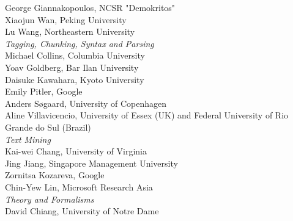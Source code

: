                                     \hspace*{0.2in} George Giannakopoulos, NCSR "Demokritos" \\
                                    \hspace*{0.2in} Xiaojun Wan, Peking University \\
                                    \hspace*{0.2in} Lu Wang, Northeastern University \\
                            \emph{Tagging, Chunking, Syntax and Parsing} \\
                                    \hspace*{0.2in} Michael Collins, Columbia University \\
                                    \hspace*{0.2in} Yoav Goldberg, Bar Ilan University \\
                                    \hspace*{0.2in} Daisuke Kawahara, Kyoto University \\
                                    \hspace*{0.2in} Emily Pitler, Google \\
                                    \hspace*{0.2in} Anders S{\o}gaard, University of Copenhagen \\
                                    \hspace*{0.2in} Aline Villavicencio, University of Essex (UK) and Federal University of Rio Grande do Sul (Brazil) \\
                            \emph{Text Mining} \\
                                    \hspace*{0.2in} Kai-wei Chang, University of Virginia \\
                                    \hspace*{0.2in} Jing Jiang, Singapore Management University \\
                                    \hspace*{0.2in} Zornitsa Kozareva, Google \\
                                    \hspace*{0.2in} Chin-Yew Lin, Microsoft Research Asia \\
                            \emph{Theory and Formalisms} \\
                                    \hspace*{0.2in} David Chiang, University of Notre Dame \\
